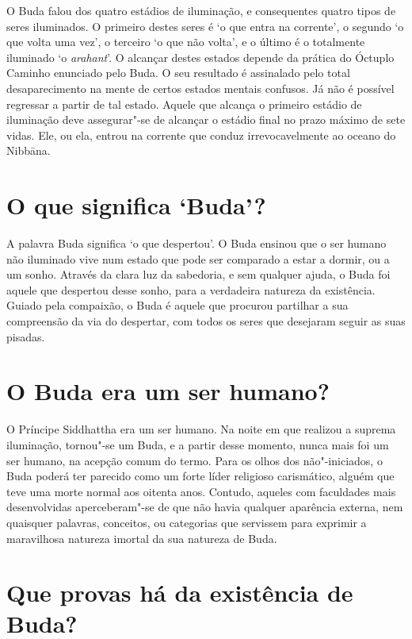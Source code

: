 O Buda falou dos quatro estádios de iluminação, e consequentes quatro
tipos de seres iluminados. O primeiro destes seres é `o que entra na
corrente', o segundo `o que volta uma vez', o terceiro `o que não
volta', e o último é o totalmente iluminado `o \emph{arahant}'. O
alcançar destes estados depende da prática do Óctuplo Caminho enunciado
pelo Buda. O seu resultado é assinalado pelo total desaparecimento na
mente de certos estados mentais confusos. Já não é possível regressar a
partir de tal estado. Aquele que alcança o primeiro estádio de
iluminação deve assegurar"-se de alcançar o estádio final no prazo máximo
de sete vidas. Ele, ou ela, entrou na corrente que conduz
irrevocavelmente ao oceano do Nibbāna.

\section{O que significa `Buda'?}

A palavra Buda significa `o que despertou'. O Buda ensinou que o ser
humano não iluminado vive num estado que pode ser comparado a estar a
dormir, ou a um sonho. Através da clara luz da sabedoria, e sem qualquer
ajuda, o Buda foi aquele que despertou desse sonho, para a verdadeira
natureza da existência. Guiado pela compaixão, o Buda é aquele que
procurou partilhar a sua compreensão da via do despertar, com todos os
seres que desejaram seguir as suas pisadas.

\section{O Buda era um ser humano?}

O Príncipe Siddhattha era um ser humano. Na noite em que realizou a
suprema iluminação, tornou"-se um Buda, e a partir desse momento, nunca
mais foi um ser humano, na acepção comum do termo. Para os olhos dos
não"-iniciados, o Buda poderá ter parecido como um forte líder religioso
carismático, alguém que teve uma morte normal aos oitenta anos. Contudo,
aqueles com faculdades mais desenvolvidas aperceberam"-se de que não
havia qualquer aparência externa, nem quaisquer palavras, conceitos, ou
categorias que servissem para \mbox{exprimir} a maravilhosa natureza imortal da
sua natureza de Buda.

\section{Que provas há da existência de Buda?}

